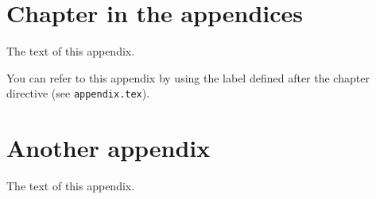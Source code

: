 \begin{appendices}

\chapter{Chapter in the appendices}
\label{apx:example}

The text of this appendix. 

You can refer to this appendix by using the label defined after the chapter directive (see \texttt{appendix.tex}).

\restoregeometry
\newpage

\chapter{Another appendix}
The text of this appendix.
\end{appendices}
